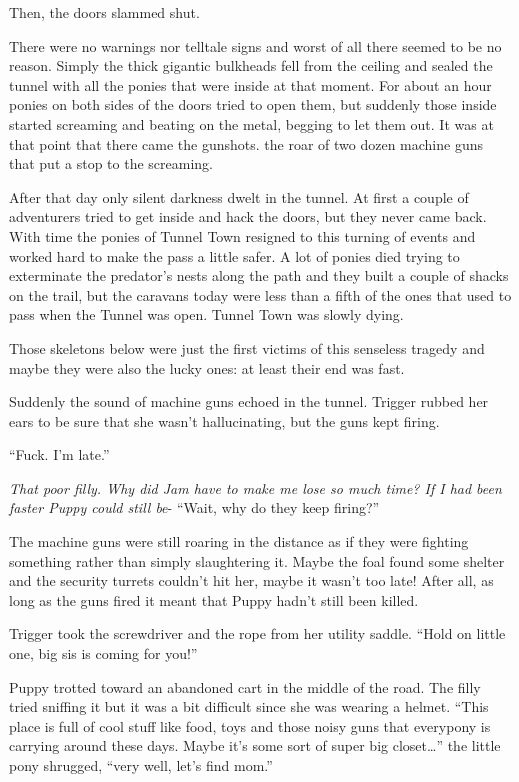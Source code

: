 Then, the doors slammed shut.

There were no warnings nor telltale signs and worst of all there seemed to be no reason. Simply the thick gigantic bulkheads fell from the ceiling and sealed the tunnel with all the ponies that were inside at that moment. For about an hour ponies on both sides of the doors tried to open them, but suddenly those inside started screaming and beating on the metal, begging to let them out. It was at that point that there came the gunshots. the roar of two dozen machine guns that put a stop to the screaming.

After that day only silent darkness dwelt in the tunnel. At first a couple of adventurers tried to get inside and hack the doors, but they never came back. With time the ponies of Tunnel Town resigned to this turning of events and worked hard to make the pass a little safer. A lot of ponies died trying to exterminate the predator's nests along the path and they built a couple of shacks on the trail, but the caravans today were less than a fifth of the ones that used to pass when the Tunnel was open. Tunnel Town was slowly dying.

Those skeletons below were just the first victims of this senseless tragedy and maybe they were also the lucky ones: at least their end was fast.

Suddenly the sound of machine guns echoed in the tunnel. Trigger rubbed her ears to be sure that she wasn't hallucinating, but the guns kept firing.

``Fuck. I'm late.''

\emph{That poor filly. Why did Jam have to make me lose so much time? If I had been faster Puppy could still be}- ``Wait, why do they keep firing?''

The machine guns were still roaring in the distance as if they were fighting something rather than simply slaughtering it. Maybe the foal found some shelter and the security turrets couldn't hit her, maybe it wasn't too late! After all, as long as the guns fired it meant that Puppy hadn't still been killed.

Trigger took the screwdriver and the rope from her utility saddle. ``Hold on little one, big sis is coming for you!''

\horizonline


Puppy trotted toward an abandoned cart in the middle of the road. The filly tried sniffing it but it was a bit difficult since she was wearing a helmet. ``This place is full of cool stuff like food, toys and those noisy guns that everypony is carrying around these days. Maybe it's some sort of super big closet\dots'' the little pony shrugged, ``very well, let's find mom.''

